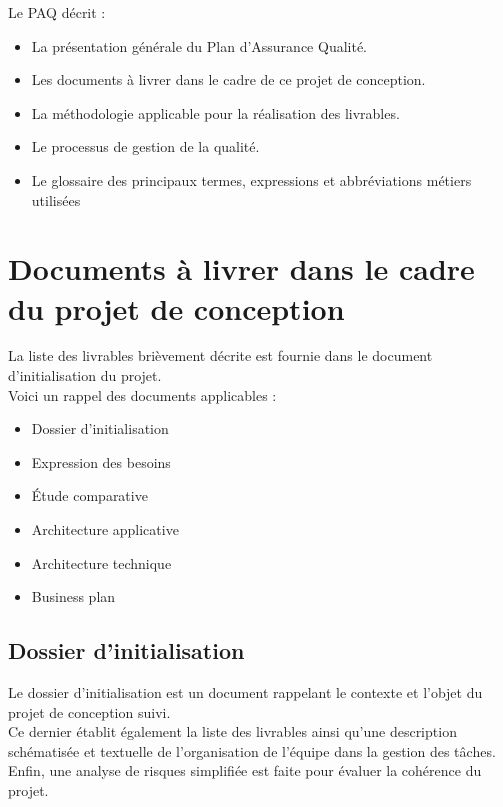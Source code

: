 Le PAQ décrit :
\begin{itemize}
  \item La présentation générale du Plan d'Assurance Qualité.
  \item Les documents à livrer dans le cadre de ce projet de conception.
  \item La méthodologie applicable pour la réalisation des livrables.
  \item Le processus de gestion de la qualité.
  \item Le glossaire des principaux termes, expressions et abbréviations
    métiers utilisées
\end{itemize}

\section{Documents à livrer dans le cadre du projet de conception}
La liste des livrables brièvement décrite est fournie dans le document
d'initialisation du projet. \\

Voici un rappel des documents applicables :
\begin{itemize}
  \item Dossier d'initialisation
  \item Expression des besoins
  \item Étude comparative
  \item Architecture applicative
  \item Architecture technique
  \item Business plan
\end{itemize}

\subsection{Dossier d'initialisation}
Le dossier d'initialisation est un document rappelant le contexte et l'objet du
projet de conception suivi. \\

Ce dernier établit également la liste des livrables ainsi qu'une description
schématisée et textuelle de l'organisation de l'équipe dans la gestion des
tâches. \\
Enfin, une analyse de risques simplifiée est faite pour évaluer la cohérence du
projet. \\

